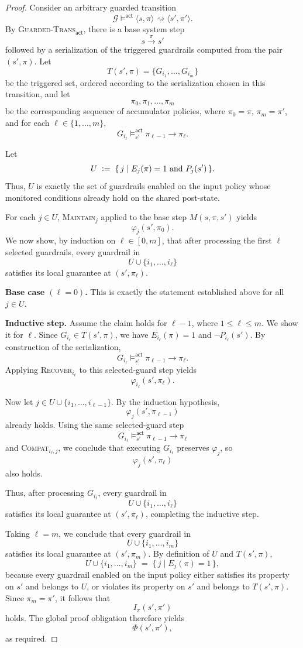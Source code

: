 \begin{proof}
Consider an arbitrary guarded transition
\[
\mathcal G \models^{\mathsf{act}} \langle s,\pi\rangle \rightsquigarrow \langle s',\pi'\rangle.
\]
By \textsc{Guarded-Trans}$_{\mathsf{act}}$, there is a base system step
\[
s \xrightarrow{\pi} s'
\]
followed by a serialization of the triggered guardrails computed from the pair
$(s',\pi)$. Let
\[
T(s',\pi)=\{G_{i_1},\ldots,G_{i_m}\}
\]
be the triggered set, ordered according to the serialization chosen in this
transition, and let
\[
\pi_0,\pi_1,\ldots,\pi_m
\]
be the corresponding sequence of accumulator policies, where $\pi_0=\pi$,
$\pi_m=\pi'$, and for each $\ell \in \{1,\ldots,m\}$,
\[
G_{i_\ell}\models^{\mathsf{act}}_{s'} \pi_{\ell-1}\to \pi_\ell .
\]

Let
\[
U \;\mathrel{\mathop:}=\; \{\, j \mid E_j(\pi)=1 \text{ and } P_j(s') \,\}.
\]
Thus, $U$ is exactly the set of guardrails enabled on the input policy whose
monitored conditions already hold on the shared post-state.

For each $j \in U$, \textsc{Maintain}$_j$ applied to the base step
$M(s,\pi,s')$ yields
\[
\varphi_j(s',\pi_0).
\]
We now show, by induction on $\ell \in [0,m]$, that after processing the first
$\ell$ selected guardrails, every guardrail in
\[
U \cup \{i_1,\ldots,i_\ell\}
\]
satisfies its local guarantee at $(s',\pi_\ell)$.

\medskip
\noindent
\textbf{Base case $(\ell=0)$.}
This is exactly the statement established above for all $j \in U$.

\medskip
\noindent
\textbf{Inductive step.}
Assume the claim holds for $\ell-1$, where $1 \le \ell \le m$. We show it for
$\ell$.
Since $G_{i_\ell}\in T(s',\pi)$, we have $E_{i_\ell}(\pi)=1$ and
$\neg P_{i_\ell}(s')$. By construction of the serialization,
\[
G_{i_\ell}\models^{\mathsf{act}}_{s'} \pi_{\ell-1}\to \pi_\ell .
\]
Applying \textsc{Recover}$_{i_\ell}$ to this selected-guard step yields
\[
\varphi_{i_\ell}(s',\pi_\ell).
\]

Now let $j \in U \cup \{i_1,\ldots,i_{\ell-1}\}$. By the induction hypothesis,
\[
\varphi_j(s',\pi_{\ell-1})
\]
already holds. Using the same selected-guard step
\[
G_{i_\ell}\models^{\mathsf{act}}_{s'} \pi_{\ell-1}\to \pi_\ell
\]
and \textsc{Compat}$_{i_\ell,j}$, we conclude that executing $G_{i_\ell}$
preserves $\varphi_j$, so
\[
\varphi_j(s',\pi_\ell)
\]
also holds.

Thus, after processing $G_{i_\ell}$, every guardrail in
\[
U \cup \{i_1,\ldots,i_\ell\}
\]
satisfies its local guarantee at $(s',\pi_\ell)$, completing the inductive
step.

Taking $\ell=m$, we conclude that every guardrail in
\[
U \cup \{i_1,\ldots,i_m\}
\]
satisfies its local guarantee at $(s',\pi_m)$.
By definition of $U$ and $T(s',\pi)$,
\[
U \cup \{i_1,\ldots,i_m\}
\;=\;
\{\, j \mid E_j(\pi)=1 \,\},
\]
because every guardrail enabled on the input policy either satisfies its
property on $s'$ and belongs to $U$, or violates its property on $s'$ and
belongs to $T(s',\pi)$.
Since $\pi_m=\pi'$, it follows that
\[
I_\pi(s',\pi')
\]
holds.
The global proof obligation therefore yields
\[
\Phi(s',\pi'),
\]
as required.
\end{proof}

